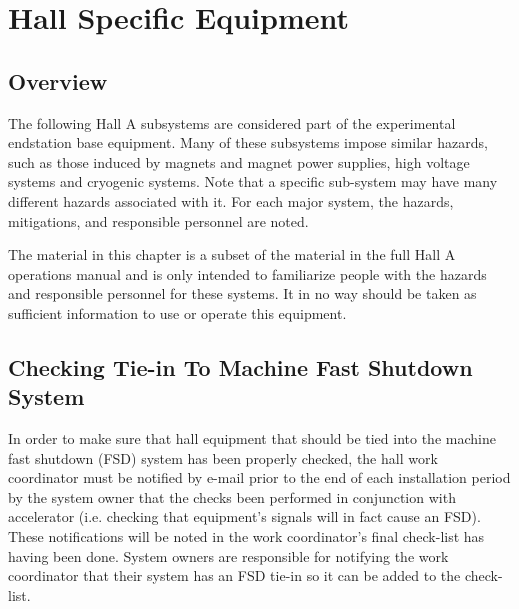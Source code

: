 %
%
\chapter{Hall Specific Equipment}

\section{Overview}

        The following Hall A subsystems are considered part of the experimental endstation base equipment.
Many of these subsystems impose similar hazards, such as those induced by magnets and magnet power supplies,
high voltage systems and cryogenic systems.  Note that a specific sub-system may have many different hazards associated with it.
For each major system, the hazards, mitigations, and responsible personnel are noted.

The material in this chapter is a subset of the material in the full Hall A operations manual and is only intended to familiarize
people with the hazards and responsible personnel for these systems.  It in no way should be taken as sufficient information to
use or operate this equipment.

\section{Checking Tie-in To Machine Fast Shutdown System}

In order to make sure that hall equipment that should be tied into the machine fast shutdown (FSD) system
has been properly checked, the hall work coordinator must be notified by e-mail prior to the end of each
installation period by the system owner
that the checks been performed in conjunction with accelerator (i.e. checking that equipment's signals
will in fact cause an FSD).  These notifications will be
noted in the work coordinator's final check-list has having been done.   System owners are responsible
for notifying the work coordinator that their system has an FSD tie-in so it can be added to the check-list.


%
%

